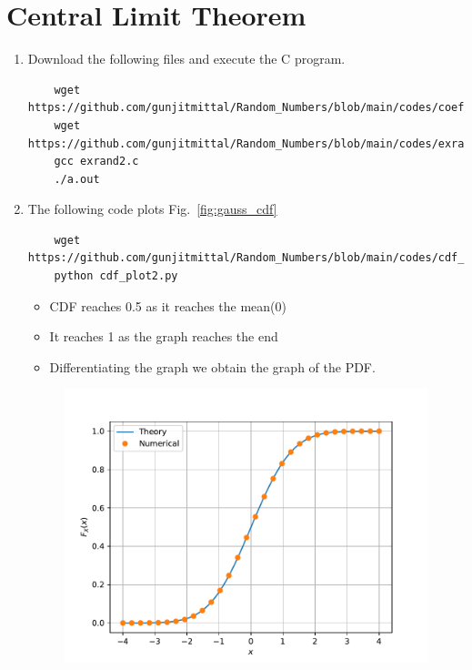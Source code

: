\documentclass[journal,12pt,twocolumn]{IEEEtran}
\renewcommand\thesection{\arabic{section}}
\begin{document}
    \section{Central Limit Theorem}
    \begin{enumerate}[label=\thesection.\arabic*
,ref=\thesection.\theenumi]
    \item \solution{} Download the following files and execute the  C program.
    \begin{lstlisting}
    wget https://github.com/gunjitmittal/Random_Numbers/blob/main/codes/coeffs.h
    wget https://github.com/gunjitmittal/Random_Numbers/blob/main/codes/exrand2.c
    gcc exrand2.c
    ./a.out
    \end{lstlisting}
    \item \solution{}
    The following code plots Fig.~\ref{fig:gauss_cdf}
    \begin{lstlisting}
    wget https://github.com/gunjitmittal/Random_Numbers/blob/main/codes/cdf_plot2.py
    python cdf_plot2.py
    \end{lstlisting}
    \begin{itemize}
        \item CDF reaches 0.5 as it reaches the mean(0)\\ 
        \item It reaches 1 as the graph reaches the end\\
        \item Differentiating the graph we obtain the graph of the PDF.
    \end{itemize}
    \begin{figure}[h]
        \centering
        \includegraphics[width=\columnwidth]{../figs/gauss_cdf}

\end{figure}
\end{enumerate}
\end{document}
